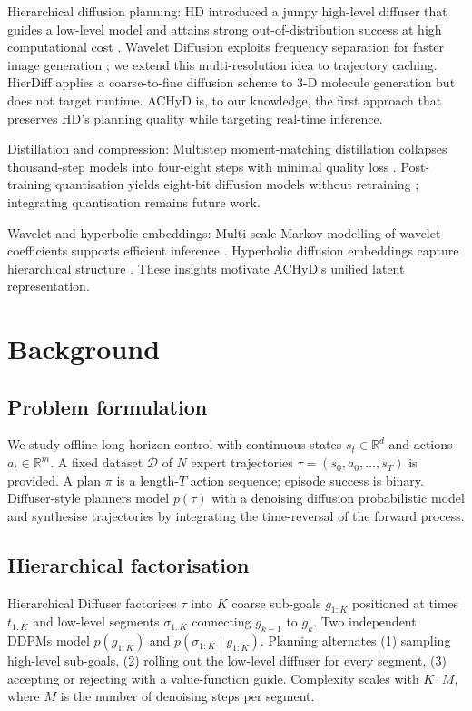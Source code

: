 \documentclass{article}
\begin{document}
Hierarchical diffusion planning: HD introduced a jumpy high-level diffuser that guides a low-level model and attains strong out-of-distribution success at high computational cost \cite{chen-2024-simple}. Wavelet Diffusion exploits frequency separation for faster image generation \cite{phung-2022-wavelet}; we extend this multi-resolution idea to trajectory caching. HierDiff applies a coarse-to-fine diffusion scheme to 3-D molecule generation \cite{qiang-2023-coarse} but does not target runtime. ACHyD is, to our knowledge, the first approach that preserves HD's planning quality while targeting real-time inference.

Distillation and compression: Multistep moment-matching distillation collapses thousand-step models into four-eight steps with minimal quality loss \cite{salimans-2024-multistep}. Post-training quantisation yields eight-bit diffusion models without retraining \cite{shang-2022-post}; integrating quantisation remains future work.

Wavelet and hyperbolic embeddings: Multi-scale Markov modelling of wavelet coefficients supports efficient inference \cite{kadkhodaie-2023-learning}. Hyperbolic diffusion embeddings capture hierarchical structure \cite{lin-2023-hyperbolic}. These insights motivate ACHyD's unified latent representation.

\section{Background}
\subsection{Problem formulation}
We study offline long-horizon control with continuous states $s_t \in \mathbb{R}^d$ and actions $a_t \in \mathbb{R}^m$. A fixed dataset $\mathcal{D}$ of $N$ expert trajectories $\tau = (s_0, a_0, \ldots, s_T)$ is provided. A plan $\pi$ is a length-$T$ action sequence; episode success is binary. Diffuser-style planners model $p(\tau)$ with a denoising diffusion probabilistic model and synthesise trajectories by integrating the time-reversal of the forward process.

\subsection{Hierarchical factorisation}
Hierarchical Diffuser factorises $\tau$ into $K$ coarse sub-goals $g_{1:K}$ positioned at times $t_{1:K}$ and low-level segments $\sigma_{1:K}$ connecting $g_{k-1}$ to $g_k$. Two independent DDPMs model $p(g_{1:K})$ and $p(\sigma_{1:K} \mid g_{1:K})$. Planning alternates (1) sampling high-level sub-goals, (2) rolling out the low-level diffuser for every segment, (3) accepting or rejecting with a value-function guide. Complexity scales with $K \cdot M$, where $M$ is the number of denoising steps per segment.
\end{document}
